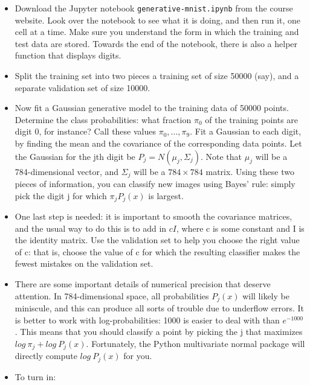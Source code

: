 \documentclass{article}
\begin{document}
\begin{itemize}
    \item Download the Jupyter notebook \texttt{generative-mnist.ipynb} from the course website.
    Look over the notebook to see what it is doing, and then run it, one cell at a time.
    Make sure you understand the form in which the training and test data are stored.
    Towards the end of the notebook, there is also a helper function that displays digits.

    \item Split the training set into two pieces a training set of size 50000 (say), and a separate validation set of size 10000.

    \item Now fit a Gaussian generative model to the training data of 50000 points.
    Determine the class probabilities: what fraction $\pi_{0}$ of the training points are digit 0, for instance?
    Call these values $\pi_{0},...,\pi_{9}$.
    Fit a Gaussian to each digit, by finding the mean and the covariance of the corresponding data points.
    Let the Gaussian for the jth digit be $P_{j}=N(\mu_{j},\Sigma_{j})$.
    Note that $\mu_{j}$ will be a 784-dimensional vector, and $\Sigma_{j}$ will be a $784\times784$ matrix.
    Using these two pieces of information, you can classify new images using Bayes' rule: simply pick the digit j for which $\pi_{j}P_{j}(x)$ is largest.

    \item One last step is needed: it is important to smooth the covariance matrices, and the usual way to do this is to add in $cI$, where c is some constant and I is the identity matrix.
    Use the validation set to help you choose the right value of c: that is, choose the value of c for which the resulting classifier makes the fewest mistakes on the validation set.

    \item There are some important details of numerical precision that deserve attention.
    In 784-dimensional space, all probabilities $P_{j}(x)$ will likely be miniscule, and this can produce all sorts of trouble due to underflow errors.
    It is better to work with log-probabilities: 1000 is easier to deal with than $e^{-1000}$.
    This means that you should classify a point by picking the j that maximizes $log~\pi_{j}+log~P_{j}(x).$
    Fortunately, the Python multivariate normal package will directly compute $log~P_{j}(x)$ for you.

    \item To turn in:


\end{itemize}
\end{document}
